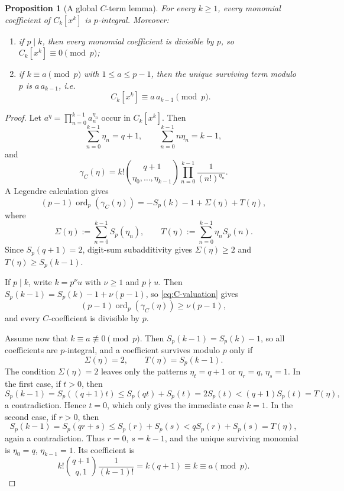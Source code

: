 \documentclass[11pt]{amsart}
\numberwithin{equation}{section}
\newtheorem{proposition}[proposition]{Proposition}
\DeclareMathOperator{\ordop}{ord}
\newcommand{\Sp}{S_p}
\newcommand{\vp}{\ordop_p}
\begin{document}
\begin{proposition}[A global $C$-term lemma]\label{prop:C-global}
For every $k\ge1$, every monomial coefficient of $C_k[x^k]$ is $p$-integral.  Moreover:
\begin{enumerate}[label=\textup{(\roman*)},leftmargin=2.2em]
\item if $p\mid k$, then every monomial coefficient is divisible by $p$, so $C_k[x^k]\equiv0\pmod p$;
\item if $k\equiv a\pmod p$ with $1\le a\le p-1$, then the unique surviving term modulo $p$ is $a\,a_{k-1}$, i.e.
\[
        C_k[x^k]\equiv a\,a_{k-1}\pmod p.
\]
\end{enumerate}
\end{proposition}
\begin{proof}
Let $a^\eta=\prod_{n=0}^{k-1}a_n^{\eta_n}$ occur in $C_k[x^k]$.  Then
\[
        \sum_{n=0}^{k-1}\eta_n=q+1,
        \qquad
        \sum_{n=0}^{k-1}n\eta_n=k-1,
\]
and
\[
        \gamma_C(\eta)=k!\binom{q+1}{\eta_0,\ldots,\eta_{k-1}}\prod_{n=0}^{k-1}\frac1{(n!)^{\eta_n}}.
\]
A Legendre calculation gives
\begin{equation}\label{eq:C-valuation}
(p-1)\vp(\gamma_C(\eta))=-\Sp(k)-1+\Sigma(\eta)+T(\eta),
\end{equation}
where
\[
        \Sigma(\eta):=\sum_{n=0}^{k-1}\Sp(\eta_n),
        \qquad
        T(\eta):=\sum_{n=0}^{k-1}\eta_n\Sp(n).
\]
Since $\Sp(q+1)=2$, digit-sum subadditivity gives $\Sigma(\eta)\ge2$ and $T(\eta)\ge\Sp(k-1)$.

If $p\mid k$, write $k=p^\nu u$ with $\nu\ge1$ and $p\nmid u$.  Then $\Sp(k-1)=\Sp(k)-1+\nu(p-1)$, so \eqref{eq:C-valuation} gives
\[
        (p-1)\vp(\gamma_C(\eta))\ge\nu(p-1),
\]
and every $C$-coefficient is divisible by $p$.

Assume now that $k\equiv a\not\equiv0\pmod p$.  Then $\Sp(k-1)=\Sp(k)-1$, so all coefficients are $p$-integral, and a coefficient survives modulo $p$ only if
\[
        \Sigma(\eta)=2,
        \qquad
        T(\eta)=\Sp(k-1).
\]
The condition $\Sigma(\eta)=2$ leaves only the patterns $\eta_t=q+1$ or $\eta_r=q$, $\eta_s=1$.  In the first case, if $t>0$, then
\[
        \Sp(k-1)=\Sp((q+1)t)\le\Sp(qt)+\Sp(t)=2\Sp(t)<(q+1)\Sp(t)=T(\eta),
\]
a contradiction.  Hence $t=0$, which only gives the immediate case $k=1$.  In the second case, if $r>0$, then
\[
        \Sp(k-1)=\Sp(qr+s)\le\Sp(r)+\Sp(s)<q\Sp(r)+\Sp(s)=T(\eta),
\]
again a contradiction.  Thus $r=0$, $s=k-1$, and the unique surviving monomial is $\eta_0=q$, $\eta_{k-1}=1$.  Its coefficient is
\[
        k!\binom{q+1}{q,1}\frac1{(k-1)!}=k(q+1)\equiv k\equiv a\pmod p.
\]
\end{proof}
\end{document}
